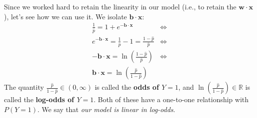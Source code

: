 \documentclass[12pt, a4paper]{article}
\theoremstyle{definition}
\begin{document}
	Since we worked hard to retain the linearity in our model (i.e., to retain the
	$\bm{w}\cdot \bm{x}$), let's see how we can use it. We isolate $\bm{b}\cdot\bm{x}$:
	\begin{align}
		\frac{1}{\hat{p}} = 1 + e^{-\bm{b}\cdot \bm{x}}&\iff \nonumber\\
		e^{-\bm{b}\cdot \bm{x}} = \frac{1}{\hat{p}} - 1 = \frac{1-\hat{p}}{\hat{p}} &\iff \nonumber\\
		-\bm{b}\cdot\bm{x} = \ln\left(\frac{1-\hat{p}}{\hat{p}}\right)&\iff \nonumber\\
		\bm{b}\cdot\bm{x} = \ln\left(\frac{\hat{p}}{1-\hat{p}}\right)&
	\end{align}
	The quantity $\frac{\hat{p}}{1 - \hat{p}}\in (0,\infty)$ is called the \textbf{odds of $Y=1$},
	and $\ln\left(\frac{\hat{p}}{1 - \hat{p}}\right)\in \mathbb{R}$ is called the \textbf{log-odds
	of $Y=1$}. Both of these have a one-to-one relationship with $P(Y = 1)$.
	We say that \textit{our model is linear in log-odds}.
	
\end{document}
